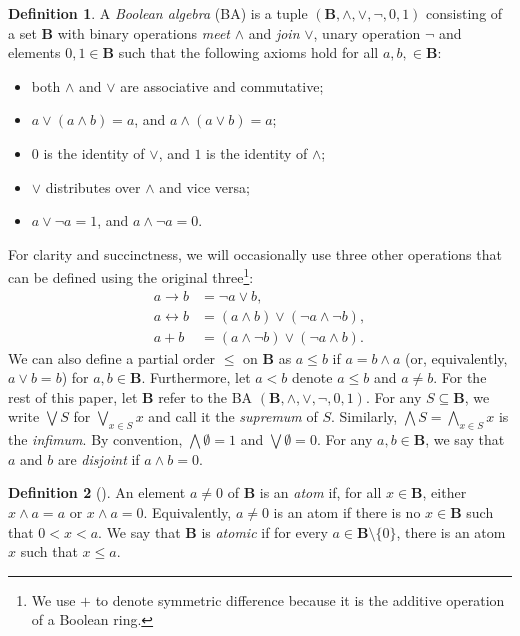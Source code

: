\documentclass{article}
\theoremstyle{definition}
\newtheorem{definition}{Definition}
\theoremstyle{remark}
\begin{document}

\begin{definition} \label{def:ba}
  A \emph{Boolean algebra} (BA) is a tuple $(\mathbf{B}, \land, \lor, \neg, 0,
  1)$ consisting of a set $\mathbf{B}$ with binary operations \emph{meet}
  $\land$ and \emph{join} $\lor$, unary operation $\neg$ and elements $0, 1 \in
  \mathbf{B}$ such that the following axioms hold for all $a, b, \in
  \mathbf{B}$:
  \begin{itemize}
  \item both $\land$ and $\lor$ are associative and commutative;
  \item $a \lor (a \land b) = a$, and $a \land (a \lor b) = a$;
  \item $0$ is the identity of $\lor$, and $1$ is the identity of $\land$;
  \item $\lor$ distributes over $\land$ and vice versa;
  \item $a \lor \neg a = 1$, and $a \land \neg a = 0$.
  \end{itemize}
\end{definition}

For clarity and succinctness, we will occasionally use three other operations
that can be defined using the original three\footnote{We use $+$ to denote
  symmetric difference because it is the additive operation of a Boolean ring.}:
\begin{align*}
  a \to b &= \neg a \lor b, \\
  a \leftrightarrow b &= (a \land b) \lor (\neg a \land \neg b), \\
  a + b &= (a \land \neg b) \lor (\neg a \land b).
\end{align*}
We can also define a partial order $\le$ on $\mathbf{B}$ as $a \le b$ if $a = b
\land a$ (or, equivalently, $a \lor b = b$) for $a, b \in \mathbf{B}$.
Furthermore, let $a < b$ denote $a \le b$ and $a \ne b$. For the rest of this
paper, let $\mathbf{B}$ refer to the BA $(\mathbf{B}, \land, \lor, \neg, 0, 1)$.
For any $S \subseteq \mathbf{B}$, we write $\bigvee S$ for $\bigvee_{x \in S} x$
and call it the \emph{supremum} of $S$. Similarly, $\bigwedge S = \bigwedge_{x
  \in S} x$ is the \emph{infimum}. By convention, $\bigwedge \emptyset = 1$ and
$\bigvee \emptyset = 0$. For any $a, b \in \mathbf{B}$, we say that $a$ and $b$
are \emph{disjoint} if $a \land b = 0$.

\begin{definition}[\cite{DBLP:books/daglib/0090259,levasseur2012applied}]
  An element $a \ne 0$ of $\mathbf{B}$ is an \emph{atom} if, for all $x \in
  \mathbf{B}$, either $x \land a = a$ or $x \land a = 0$. Equivalently, $a \ne
  0$ is an atom if there is no $x \in \mathbf{B}$ such that $0 < x < a$. We say
  that $\mathbf{B}$ is \emph{atomic} if for every $a \in \mathbf{B} \setminus \{0
  \}$, there is an atom $x$ such that $x \le a$.
\end{definition}
\end{document}

